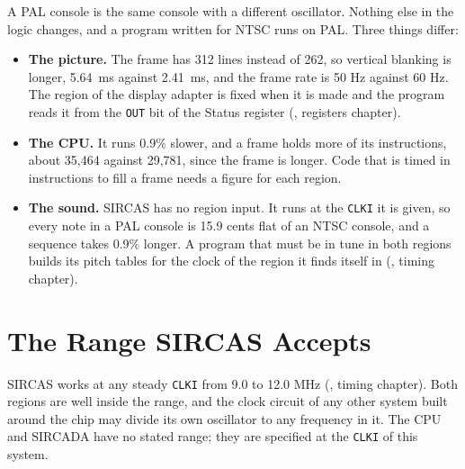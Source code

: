 A PAL console is the same console with a different oscillator. Nothing else in the logic changes, and a program written
for NTSC runs on PAL. Three things differ:

\begin{itemize}
	\item \textbf{The picture.} The frame has 312 lines instead of 262, so vertical blanking is longer, 5.64~ms
	      against 2.41~ms, and the frame rate is 50 Hz against 60 Hz. The region of the display adapter is fixed when
	      it is made and the program reads it from the \texttt{OUT} bit of the Status register
	      (\videomanual{}, registers chapter).
	\item \textbf{The CPU.} It runs 0.9\% slower, and a frame holds more of its instructions, about 35,464 against
	      29,781, since the frame is longer. Code that is timed in instructions to fill a frame needs a figure for each
	      region.
	\item \textbf{The sound.} SIRCAS has no region input. It runs at the \texttt{CLKI} it is given, so every note in a
	      PAL console is 15.9 cents flat of an NTSC console, and a sequence takes 0.9\% longer. A program that must be in
	      tune in both regions builds its pitch tables for the clock of the region it finds itself in
	      (\audiomanual{}, timing chapter).
\end{itemize}

\section{The Range SIRCAS Accepts}

SIRCAS works at any steady \texttt{CLKI} from 9.0 to 12.0 MHz (\audiomanual{}, timing chapter). Both regions are well
inside the range, and the clock circuit of any other system built around the chip may divide its own oscillator to any
frequency in it. The CPU and SIRCADA have no stated range; they are specified at the \texttt{CLKI} of this system.
